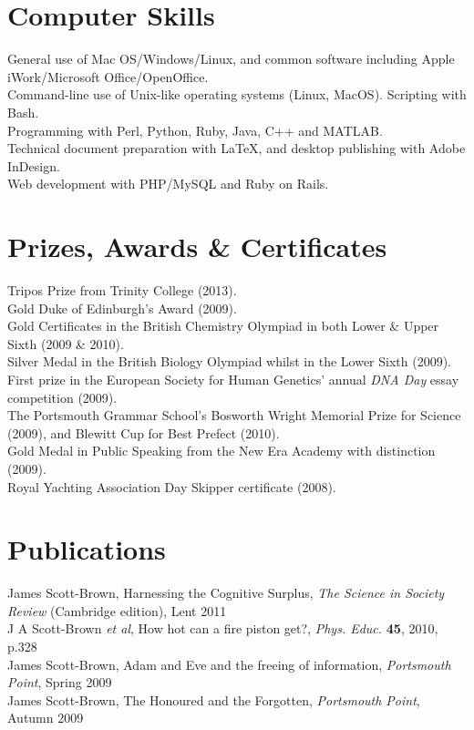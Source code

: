 \documentclass[letterpaper]{article}
\newcommand{\nextItemTight}{\\[0.2\baselineskip]}
\begin{document}
\section*{Computer Skills}
General use of Mac OS/Windows/Linux, and common software including Apple iWork/Microsoft Office/OpenOffice.\nextItemTight
Command-line use of Unix-like operating systems (Linux, MacOS). Scripting with Bash.\nextItemTight
Programming with Perl, Python, Ruby, Java, C++ and MATLAB.\nextItemTight
Technical document preparation with \LaTeX, and desktop publishing with Adobe InDesign.\nextItemTight
Web development with PHP/MySQL and Ruby on Rails.


\section*{Prizes, Awards \& Certificates}
Tripos Prize from Trinity College (2013).\nextItemTight
Gold Duke of Edinburgh's Award (2009).\nextItemTight
Gold Certificates in the British Chemistry Olympiad in both Lower \& Upper Sixth (2009 \& 2010). \nextItemTight
Silver Medal in the British Biology Olympiad whilst in the Lower Sixth (2009). \nextItemTight
First prize in the European Society for Human Genetics' annual \textit{DNA Day} essay competition (2009). \nextItemTight
The Portsmouth Grammar School's Bosworth Wright Memorial Prize for Science (2009), and Blewitt Cup for Best Prefect (2010).\nextItemTight
Gold Medal in Public Speaking from the New Era Academy with distinction (2009).\nextItemTight
Royal Yachting Association Day Skipper certificate (2008).

\section*{Publications}
James Scott-Brown, Harnessing the Cognitive Surplus, \textit{The Science in Society Review} (Cambridge edition), Lent 2011\nextItemTight
J A Scott-Brown \textit{et al}, How hot can a fire piston get?, \textit{Phys. Educ.} {\bf 45}, 2010, p.328\nextItemTight
James Scott-Brown, Adam and Eve and the freeing of information, \textit{Portsmouth Point}, Spring 2009\nextItemTight
James Scott-Brown, The Honoured and the Forgotten, \textit{Portsmouth Point}, Autumn 2009

\vspace{0.3 cm}
\end{document}
